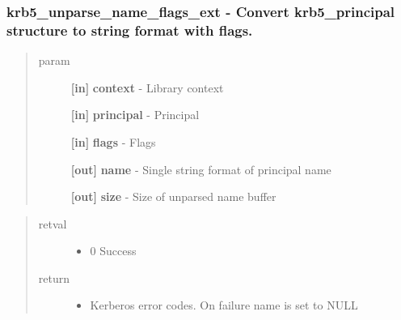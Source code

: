 \documentclass[letterpaper,10pt,english]{sphinxmanual}
\begin{document}
\subsubsection{krb5\_unparse\_name\_flags\_ext -  Convert krb5\_principal structure to string format with flags.}
\label{appdev/refs/api/krb5_unparse_name_flags_ext:krb5-unparse-name-flags-ext-convert-krb5-principal-structure-to-string-format-with-flags}\label{appdev/refs/api/krb5_unparse_name_flags_ext::doc}

\begin{fulllineitems}
\label{appdev/refs/api/krb5_unparse_name_flags_ext:krb5_unparse_name_flags_ext}
\end{fulllineitems}

\begin{quote}\begin{description}
\item[{param}] \leavevmode
\textbf{{[}in{]}} \textbf{context} - Library context

\textbf{{[}in{]}} \textbf{principal} - Principal

\textbf{{[}in{]}} \textbf{flags} - Flags

\textbf{{[}out{]}} \textbf{name} - Single string format of principal name

\textbf{{[}out{]}} \textbf{size} - Size of unparsed name buffer

\end{description}\end{quote}
\begin{quote}\begin{description}
\item[{retval}] \leavevmode\begin{itemize}
\item {} 
0   Success

\end{itemize}

\item[{return}] \leavevmode\begin{itemize}
\item {} 
Kerberos error codes. On failure name is set to NULL

\end{itemize}

\end{description}\end{quote}
\end{document}
